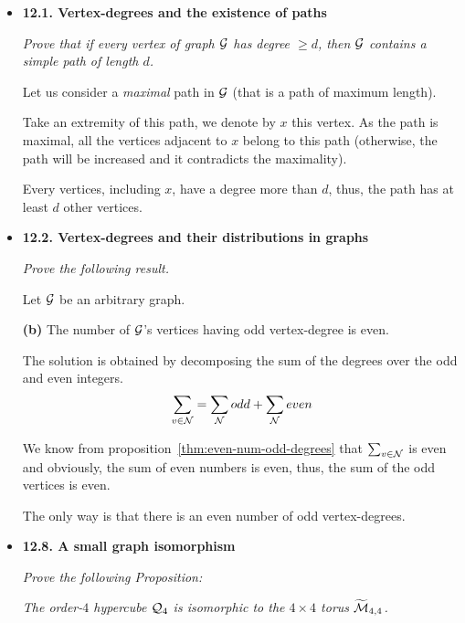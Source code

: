 \begin{itemize}
\item
{\bf 12.1. Vertex-degrees and the existence of paths}
\smallskip

{\em Prove that if every vertex of graph $\mbox{$\cal G$}$ has degree $\geq d$, then $\mbox{$\cal G$}$ contains a {\em simple} path of length $d$.}
\smallskip

Let us consider a \textit{maximal} path in $\mbox{$\cal G$}$ (that is a path of maximum length). 

Take an extremity of this path, we denote by $x$ this vertex.
As the path is maximal, all the vertices adjacent to $x$ belong to this path (otherwise, the path will be increased
and it contradicts the maximality).

Every vertices, including $x$, have a degree more than $d$, thus, the path has at least $d$ other vertices.

\medskip\item
{\bf 12.2. Vertex-degrees and their distributions in graphs}
\smallskip

{\em Prove the following result.}

Let $\mbox{$\cal G$}$ be an arbitrary graph.
\smallskip

{\bf (b)}
The number of $\mbox{$\cal G$}$'s vertices having odd vertex-degree is even.

The solution is obtained by decomposing the sum of the degrees over the odd and even integers.
\[
\sum_{v \in {\cal N}}  =  \sum_{\cal N} odd + \sum_{\cal N} even
\]
\smallskip

We know from proposition~\ref{thm:even-num-odd-degrees} that 
$\sum_{v \in {\cal N}}$ is even and obviously, the sum of even numbers is even,
thus,  the sum of the odd vertices is even.

The only way is that there is an even number of odd vertex-degrees. 

\medskip\item
{\bf 12.8. A small graph isomorphism}
\smallskip

{\em Prove the following Proposition:}
\smallskip

{\em The order-$4$ hypercube $\mbox{$\cal Q$}_4$ is \textit{isomorphic} to the $4 \times 4$ torus $\widetilde{\mbox{$\cal M$}}_{4,4}$.}
\smallskip

%


\end{itemize}

